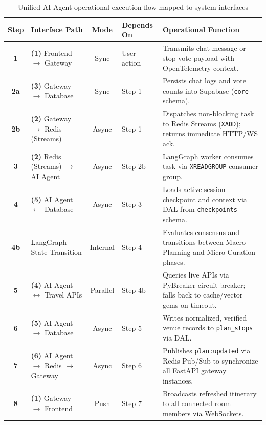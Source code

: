 \documentclass[11pt,a4paper]{article}
\begin{document}
\begin{table}[H]
\centering
\footnotesize
\renewcommand{\arraystretch}{1.06}
\begin{tabularx}{\textwidth}{@{}c l c l >{\raggedright\arraybackslash}X@{}}
\toprule
\textbf{Step} & \textbf{Interface Path} & \textbf{Mode} & \textbf{Depends On} & \textbf{Operational Function} \\
\midrule
\textbf{1} & \textbf{(1)} Frontend $\rightarrow$ Gateway & Sync & User action & Transmits chat message or stop vote payload with OpenTelemetry context. \\
\textbf{2a} & \textbf{(3)} Gateway $\rightarrow$ Database & Sync & Step 1 & Persists chat logs and vote counts into Supabase (\texttt{core} schema). \\
\textbf{2b} & \textbf{(2)} Gateway $\rightarrow$ Redis (Streams) & Async & Step 1 & Dispatches non-blocking task to Redis Streams (\texttt{XADD}); returns immediate HTTP/WS ack. \\
\textbf{3} & \textbf{(2)} Redis (Streams) $\rightarrow$ AI Agent & Async & Step 2b & LangGraph worker consumes task via \texttt{XREADGROUP} consumer group. \\
\textbf{4} & \textbf{(5)} AI Agent $\leftarrow$ Database & Async & Step 3 & Loads active session checkpoint and context via DAL from \texttt{checkpoints} schema. \\
\textbf{4b} & LangGraph State Transition & Internal & Step 4 & Evaluates consensus and transitions between Macro Planning and Micro Curation phases. \\
\textbf{5} & \textbf{(4)} AI Agent $\leftrightarrow$ Travel APIs & Parallel & Step 4b & Queries live APIs via PyBreaker circuit breaker; falls back to cache/vector gems on timeout. \\
\textbf{6} & \textbf{(5)} AI Agent $\rightarrow$ Database & Async & Step 5 & Writes normalized, verified venue records to \texttt{plan\_stops} via DAL. \\
\textbf{7} & \textbf{(6)} AI Agent $\rightarrow$ Redis $\rightarrow$ Gateway & Async & Step 6 & Publishes \texttt{plan:updated} via Redis Pub/Sub to synchronize all FastAPI gateway instances. \\
\textbf{8} & \textbf{(1)} Gateway $\rightarrow$ Frontend & Push & Step 7 & Broadcasts refreshed itinerary to all connected room members via WebSockets. \\
\bottomrule
\end{tabularx}
\vspace{-0.2cm}
\caption{Unified AI Agent operational execution flow mapped to system interfaces}
\label{tab:system_flow_summary}
\end{table}
\end{document}
